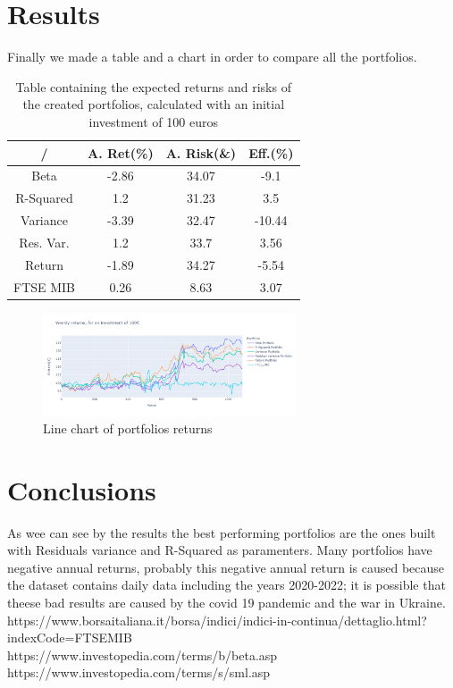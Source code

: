 \documentclass[12pt, a4paper, twocolumn]{article} %
\begin{document}
	\section{Results}
		Finally we made a table and a chart in order to compare all the portfolios.
	\begin{table}[H]
		\centering
		\caption{Table containing the expected returns and risks of the created portfolios, calculated with an initial investment of 100 euros}
		\begin{tabular}{cccc} %
			\hline
			/ & A. Ret(\%) & A. Risk(\&) & Eff.(\%)\\
			\hline
			Beta & -2.86 & 34.07 & -9.1\\
			R-Squared & 1.2 & 31.23 & 3.5\\
			Variance & -3.39 & 32.47 & -10.44\\
			Res. Var. & 1.2& 33.7 & 3.56\\
			Return & -1.89 & 34.27 & -5.54\\
			FTSE MIB &  0.26 & 8.63 & 3.07\\
		
			\hline
		\end{tabular}
	\end{table}

		\begin{figure}[H]
			\caption{Line chart of portfolios returns}
			\begin{center}
				\includegraphics[width=75mm,scale=1]{port_ret_complete_small.png}
			\end{center}
		\end{figure}

	\section{Conclusions}
	As wee can see by the results the best performing portfolios are the ones built with Residuals variance and R-Squared as paramenters. Many portfolios have negative annual returns, probably this negative annual return is caused because the dataset contains daily data including the years 2020-2022; it is possible that theese bad results are caused by the covid 19 pandemic and the war in Ukraine.
\nocite{*} %
\printbibliography[title={Bibliography}] %
https://www.borsaitaliana.it/borsa/indici/indici-in-continua/dettaglio.html?indexCode=FTSEMIB\\
https://www.investopedia.com/terms/b/beta.asp\\
https://www.investopedia.com/terms/s/sml.asp
\end{document}
